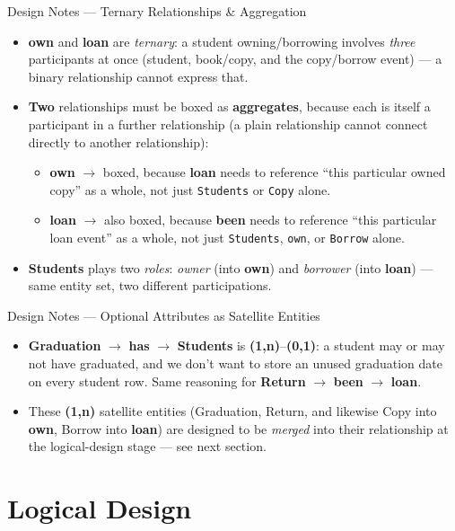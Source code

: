 \documentclass{beamer}
\begin{document}
\begin{frame}{Design Notes --- Ternary Relationships \& Aggregation}
\small
\begin{itemize}
  \item \textbf{own} and \textbf{loan} are \emph{ternary}: a student owning/borrowing involves \emph{three} participants at once (student, book/copy, and the copy/borrow event) --- a binary relationship cannot express that.
  \item \textbf{Two} relationships must be boxed as \textbf{aggregates}, because each is itself a participant in a further relationship (a plain relationship cannot connect directly to another relationship):
  \begin{itemize}
    \item \textbf{own} $\to$ boxed, because \textbf{loan} needs to reference ``this particular owned copy'' as a whole, not just \texttt{Students} or \texttt{Copy} alone.
    \item \textbf{loan} $\to$ also boxed, because \textbf{been} needs to reference ``this particular loan event'' as a whole, not just \texttt{Students}, \texttt{own}, or \texttt{Borrow} alone.
  \end{itemize}
  \item \textbf{Students} plays two \emph{roles}: \emph{owner} (into \textbf{own}) and \emph{borrower} (into \textbf{loan}) --- same entity set, two different participations.
\end{itemize}
\end{frame}

\begin{frame}{Design Notes --- Optional Attributes as Satellite Entities}
\small
\begin{itemize}
  \item \textbf{Graduation} $\to$ \textbf{has} $\to$ \textbf{Students} is \textbf{(1,n)}--\textbf{(0,1)}: a student may or may not have graduated, and we don't want to store an unused graduation date on every student row. Same reasoning for \textbf{Return} $\to$ \textbf{been} $\to$ \textbf{loan}.
  \item These \textbf{(1,n)} satellite entities (Graduation, Return, and likewise Copy into \textbf{own}, Borrow into \textbf{loan}) are designed to be \emph{merged} into their relationship at the logical-design stage --- see next section.
\end{itemize}
\end{frame}

\section{Logical Design}
\end{document}
